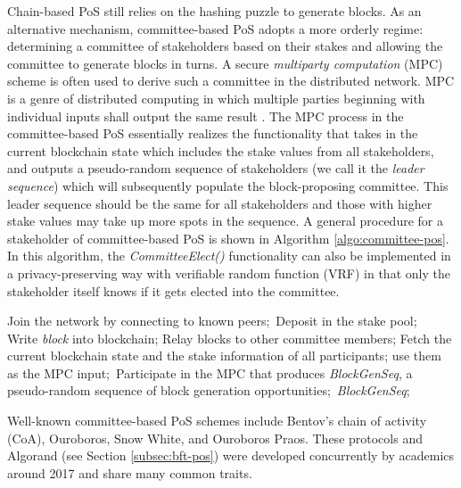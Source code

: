 \label{subsec:committee-pos}
Chain-based PoS still relies on the hashing puzzle to generate blocks. As an alternative mechanism, committee-based PoS adopts a more orderly regime: determining a committee of stakeholders based on their stakes and allowing the committee to generate blocks in turns. A secure \textit{multiparty computation} (MPC) scheme is often used to derive such a committee in the distributed network. MPC is a genre of distributed computing in which multiple parties beginning with individual inputs shall output the same result . The MPC process in the committee-based PoS essentially realizes the functionality that takes in the current blockchain state which includes the stake values from all stakeholders, and outputs a pseudo-random sequence of stakeholders (we call it the \textit{leader sequence}) which will subsequently populate the block-proposing committee. This leader sequence should be the same for all stakeholders and those with higher stake values may take up more spots in the sequence. A general procedure for a stakeholder of committee-based PoS is shown in Algorithm \ref{algo:committee-pos}. In this algorithm, the \emph{CommitteeElect()} functionality can also be implemented in a privacy-preserving way with verifiable random function (VRF)  in that only the stakeholder itself knows if it gets elected into the committee.
\begin{algorithm}
\label{algo:committee-pos}
\caption{Committee-based PoS general procedure}
\SetAlgoLined
{}
\setcounter{AlgoLine}{0}
Join the network by connecting to known peers;\
Deposit in the stake pool;\
{   
    {
        Write \textit{block} into blockchain;
        Relay blocks to other committee members;
    }
}
\tcc{PoS-based committee election}
\Fn{CommitteeElect()}
{
    Fetch the current blockchain state and the stake information of all participants; use them as the MPC input;\
    Participate in the MPC that produces \textit{BlockGenSeq}, a pseudo-random sequence of block generation opportunities;\
    \KwRet \textit{BlockGenSeq};
}
\end{algorithm}
Well-known committee-based PoS schemes include Bentov's chain of activity (CoA), Ouroboros, Snow White, and Ouroboros Praos. These protocols and Algorand (see Section \ref{subsec:bft-pos}) were developed concurrently by academics around 2017 and share many common traits.

